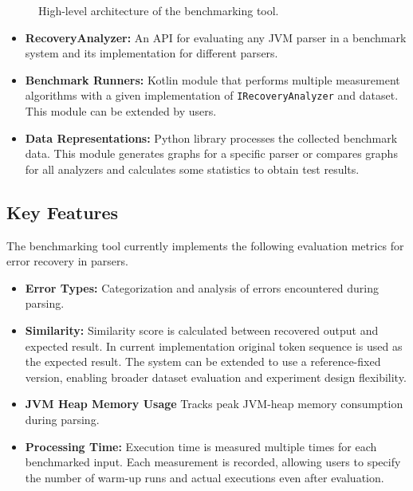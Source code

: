 \documentclass[conference]{IEEEtran}
\begin{document}
\begin{figure*}[htbp]

\caption{High-level architecture of the benchmarking tool.}\label{fig:architecture}
\end{figure*}

\begin{itemize}
    \item \textbf{RecoveryAnalyzer:} An API for evaluating any JVM parser in a benchmark system and its implementation for different parsers.
    
    \item \textbf{Benchmark Runners:} Kotlin module that performs multiple measurement algorithms with a given implementation of \texttt{IRecoveryAnalyzer} and dataset. This module can be extended by users.
    
    \item \textbf{Data Representations:} Python library processes the collected benchmark data. This module generates graphs for a specific parser or compares graphs for all analyzers and calculates some statistics to obtain test results.
    
\end{itemize}

\subsection{Key Features}
The benchmarking tool currently implements the following evaluation metrics for error recovery in parsers.

\begin{itemize}
    \item \textbf{Error Types:} Categorization and analysis of errors encountered during parsing.
    \item \textbf{Similarity:} Similarity score is calculated between recovered output and expected result.  
    In current implementation original token sequence is used as the expected result.  
    The system can be extended to use a reference-fixed version, enabling broader dataset evaluation and experiment design flexibility.

   
    \item \textbf{JVM Heap Memory Usage} Tracks peak JVM-heap memory consumption during parsing.
    \item \textbf{Processing Time:} Execution time is measured multiple times for each benchmarked input. Each measurement is recorded, allowing users to specify the number of warm-up runs and actual executions even after evaluation.

\end{itemize}
\end{document}
